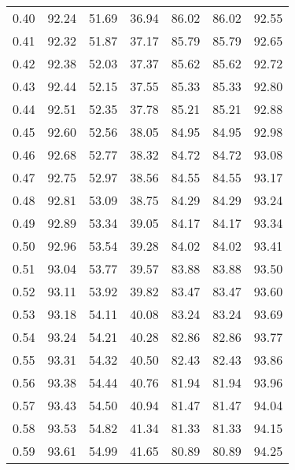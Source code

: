 \begin{tabular}{|c|c|c|c|c|c|c|}
      0.40 &     92.24 &     51.69 &      36.94 &   86.02 &      86.02 &         92.55 \\
      0.41 &     92.32 &     51.87 &      37.17 &   85.79 &      85.79 &         92.65 \\
      0.42 &     92.38 &     52.03 &      37.37 &   85.62 &      85.62 &         92.72 \\
      0.43 &     92.44 &     52.15 &      37.55 &   85.33 &      85.33 &         92.80 \\
      0.44 &     92.51 &     52.35 &      37.78 &   85.21 &      85.21 &         92.88 \\
      0.45 &     92.60 &     52.56 &      38.05 &   84.95 &      84.95 &         92.98 \\
      0.46 &     92.68 &     52.77 &      38.32 &   84.72 &      84.72 &         93.08 \\
      0.47 &     92.75 &     52.97 &      38.56 &   84.55 &      84.55 &         93.17 \\
      0.48 &     92.81 &     53.09 &      38.75 &   84.29 &      84.29 &         93.24 \\
      0.49 &     92.89 &     53.34 &      39.05 &   84.17 &      84.17 &         93.34 \\
      0.50 &     92.96 &     53.54 &      39.28 &   84.02 &      84.02 &         93.41 \\
      0.51 &     93.04 &     53.77 &      39.57 &   83.88 &      83.88 &         93.50 \\
      0.52 &     93.11 &     53.92 &      39.82 &   83.47 &      83.47 &         93.60 \\
      0.53 &     93.18 &     54.11 &      40.08 &   83.24 &      83.24 &         93.69 \\
      0.54 &     93.24 &     54.21 &      40.28 &   82.86 &      82.86 &         93.77 \\
      0.55 &     93.31 &     54.32 &      40.50 &   82.43 &      82.43 &         93.86 \\
      0.56 &     93.38 &     54.44 &      40.76 &   81.94 &      81.94 &         93.96 \\
      0.57 &     93.43 &     54.50 &      40.94 &   81.47 &      81.47 &         94.04 \\
      0.58 &     93.53 &     54.82 &      41.34 &   81.33 &      81.33 &         94.15 \\
      0.59 &     93.61 &     54.99 &      41.65 &   80.89 &      80.89 &         94.25 \\

\end{tabular}
